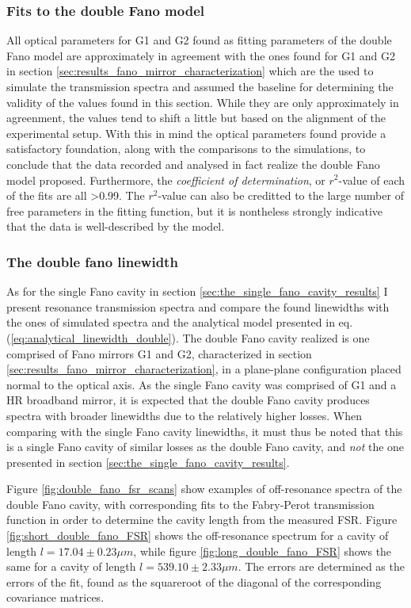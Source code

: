 \subsubsection*{Fits to the double Fano model}

All optical parameters for G1 and G2 found as fitting parameters of the double Fano model are approximately in agreement with the ones found for G1 and G2 in section \ref{sec:results_fano_mirror_characterization} which are the used to simulate the transmission spectra and assumed the baseline for determining the validity of the values found in this section. While they are only approximately in agreenment, the values tend to shift a little but based on the alignment of the experimental setup. With this in mind the optical parameters found provide a satisfactory foundation, along with the comparisons to the simulations, to conclude that the data recorded and analysed in fact realize the double Fano model proposed. Furthermore, the \emph{coefficient of determination}, or $r^2$-value of each of the fits are all >0.99. The $r^2$-value can also be creditted to the large number of free parameters in the fitting function, but it is nontheless strongly indicative that the data is well-described by the model. 

\subsubsection{The double fano linewidth}

As for the single Fano cavity in section \ref{sec:the_single_fano_cavity_results} I present resonance transmission spectra and compare the found linewidths with the ones of simulated spectra and the analytical model presented in eq. (\ref{eq:analytical_linewidth_double}). The double Fano cavity realized is one comprised of Fano mirrors G1 and G2, characterized in section \ref{sec:results_fano_mirror_characterization}, in a plane-plane configuration placed normal to the optical axis. As the single Fano cavity was comprised of G1 and a HR broadband mirror, it is expected that the double Fano cavity produces spectra with broader linewidths due to the relatively higher losses. When comparing with the single Fano cavity linewidths, it must thus be noted that this is a single Fano cavity of similar losses as the double Fano cavity, and \emph{not} the one presented in section \ref{sec:the_single_fano_cavity_results}.

Figure \ref{fig:double_fano_fsr_scans} show examples of off-resonance spectra of the double Fano cavity, with corresponding fits to the Fabry-Perot transmission function in order to determine the cavity length from the measured FSR. Figure \ref{fig:short_double_fano_FSR} shows the off-resonance spectrum for a cavity of length $l = 17.04 \pm 0.23 \mu m$, while figure \ref{fig:long_double_fano_FSR} shows the same for a cavity of length $l = 539.10 \pm 2.33 \mu m$. The errors are determined as the errors of the fit, found as the squareroot of the diagonal of the corresponding covariance matrices. 

